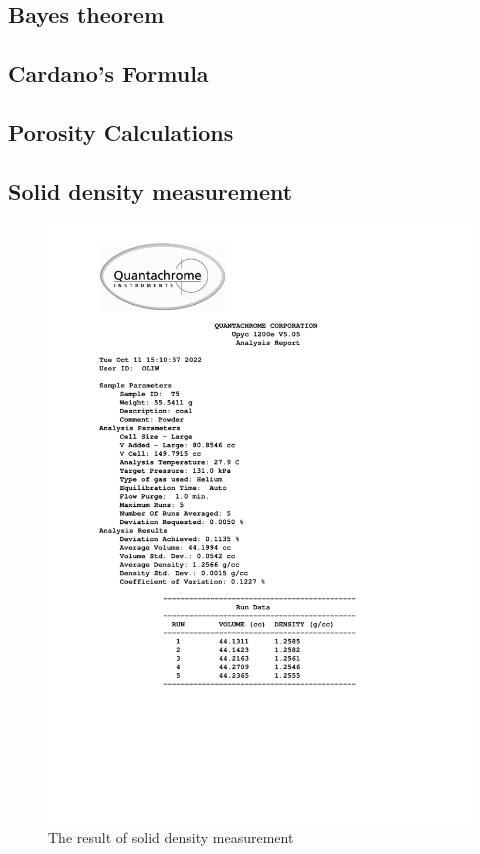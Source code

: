\documentclass[a4paper,fleqn]{cas-dc}
\begin{document}
\subsection{Bayes theorem} \label{CH: Bayes}


\subsection{Cardano's Formula} \label{CH: Cardano}


\subsection{Porosity Calculations} \label{CH: Porosity}


\clearpage
\onecolumn
\subsection{Solid density measurement} \label{CH: Solid_Density_Measurment}

\begin{figure}[!h]
	\includegraphics[trim=0cm 6cm 0cm 0cm, clip,height=0.9\textheight]{Sections/ultraReportT5.pdf}
	\caption{The result of solid density measurement}
\end{figure}
\end{document}
